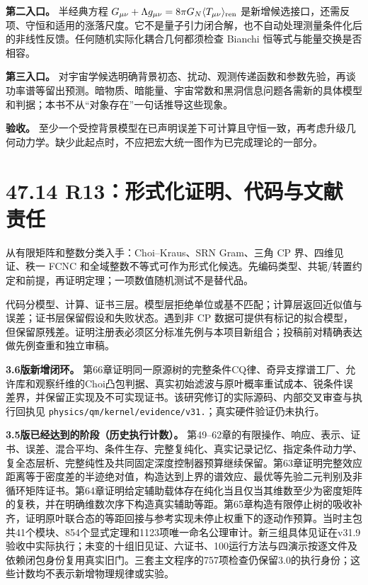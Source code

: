 \documentclass[
  11pt,
  oneside]{book}
\begin{document}
\textbf{第二入口。} 半经典方程
\(G_{\mu\nu}+\Lambda g_{\mu\nu}=8\pi G_N\langle T_{\mu\nu}\rangle_{\rm ren}\)
是新增候选接口，还需反项、守恒和适用的涨落尺度。它不是量子引力闭合解，也不自动处理测量条件化后的非线性反馈。任何随机实际化耦合几何都须检查
Bianchi 恒等式与能量交换是否相容。

\textbf{第三入口。}
对宇宙学候选明确背景初态、扰动、观测传递函数和参数先验，再谈功率谱等留出预测。暗物质、暗能量、宇宙常数和黑洞信息问题各需新的具体模型和判据；本书不从``对象存在''一句话推导这些现象。

\textbf{验收。}
至少一个受控背景模型在已声明误差下可计算且守恒一致，再考虑升级几何动力学。缺少此起点时，不应把宏大统一图作为已完成理论的一部分。

\section{47.14 R13：形式化证明、代码与文献责任}

从有限矩阵和整数分类入手：Choi--Kraus、SRN Gram、三角 CP
界、四维见证、秩一 FCNC
和全域整数不等式可作为形式化候选。先编码类型、共轭/转置约定和前提，再证明定理；一项数值随机测试不是替代品。

代码分模型、计算、证书三层。模型层拒绝单位或基不匹配；计算层返回近似值与误差；证书层保留假设和失败状态。遇到非
CP
数据可提供有标记的拟合模型，但保留原残差。证明注册表必须区分标准先例与本项目新组合；投稿前对精确表达做先例查重和独立审稿。

\textbf{3.6版新增闭环。}
第66章证明同一原源树的完整条件CQ律、奇异支撑谱工厂、允许库和观察纤维的Choi凸包判据、真实初始滤波与原叶概率重试成本、锐条件误差界，并保留正实现及不可实现证书。该研究修订的实际源码、内部交叉审查与执行回执见
\texttt{physics/\allowbreak qm/\allowbreak kernel/\allowbreak evidence/\allowbreak v31.}；真实硬件验证仍未执行。

\textbf{3.5版已经达到的阶段（历史执行计数）。}
第49--62章的有限操作、响应、表示、证书、误差、混合平均、条件生存、完整复纯化、真实记录记忆、指定条件动力学、复全态层析、完整纯性及共同固定深度控制器预算继续保留。第63章证明完整效应距离等于密度差的半迹绝对值，构造达到上界的谱效应、最优等先验二元判别及非循环矩阵证书。第64章证明给定辅助载体存在纯化当且仅当其维数至少为密度矩阵的复秩，并在明确维数次序下构造真实辅助等距。第65章构造有限停止树的吸收补齐，证明原叶联合态的等距回接与参考实现未停止权重下的逐动作预算。当时主包共41个模块、854个显式定理和1123项唯一命名公理审计。新三组具体见证在v31.9验收中实际执行；未变的十组旧见证、六证书、100运行方法与四演示按逐文件及依赖闭包身份复用真实旧门。三套主文程序的757项检查仍保留3.0的执行身份；这些计数均不表示新增物理规律或实验。
\end{document}
